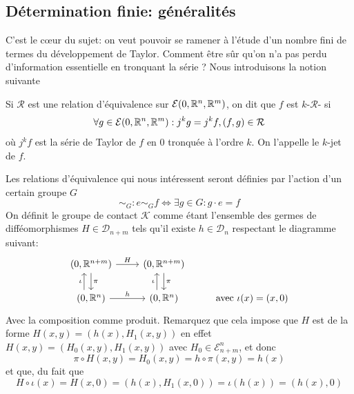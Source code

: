 \documentclass[memoire.tex]{subfiles}
\begin{document}
\subsection{Détermination finie: généralités}\label{detfin}
C'est le cœur du sujet: on veut 
pouvoir se ramener à l'étude d'un nombre fini de termes du développement de Taylor. Comment être sûr qu'on n'a pas perdu d'information essentielle en tronquant la série ?
Nous introduisons la notion suivante
\begin{definition}
    Si $\mathcal{R}$ est une relation 
    d'équivalence sur $\mathcal{E}(0,\mathbb{R}^n,\mathbb{R}^m)$, on dit que $f$ est $k$-$\mathcal{R}$- si 
    \begin{equation*}
        \forall g\in \mathcal{E}(0,\mathbb{R}^n,\mathbb{R}^m): j^k g=j^k f, (f,g)\in\mathcal{R}
    \end{equation*}
    où $j^k f$ est la série de Taylor de $f$ en $0$ tronquée à l'ordre $k$. On l'appelle le $k$-jet de $f$.
\end{definition}
Les relations d'équivalence qui nous intéressent seront définies par l'action d'un certain groupe $G$
 \begin{equation*}
    \sim_G : e \sim_Gf \Leftrightarrow \exists g\in G : g\cdot e=f
 \end{equation*}
 On définit le groupe de contact $\mathcal{K}$ comme étant l'ensemble des germes de difféomorphismes $H\in\mathcal{D}_{n+m}$ tels qu'il existe $h\in\mathcal{D}_n$ respectant le  diagramme suivant:
\[\begin{tikzcd}
	{(0,\R^{n+m})} & {(0,\R^{n+m})} & \\
	{(0,\R^n)} & {(0,\R^n)} & {\text{avec }\iota(x)=(x,0)}
	\arrow["H", from=1-1, to=1-2]
	\arrow["\pi", from=1-1, to=2-1]
	\arrow["\pi", from=1-2, to=2-2]
	\arrow["\iota", shift left=3, from=2-1, to=1-1]
	\arrow["h", from=2-1, to=2-2]
	\arrow["\iota", shift left=3, from=2-2, to=1-2]
\end{tikzcd}\]
Avec la composition comme produit.
Remarquez que cela impose que $H$ est de la forme $H(x,y)=(h(x),H_1(x,y))$ en effet 
$H(x,y)=(H_0(x,y),H_1(x,y))$ avec $H_0\in\mathcal{E}^n_{n+m}$, et donc 
\begin{equation*}\label{Structpi}
    \pi\circ H(x,y)= H_0(x,y)=h\circ\pi(x,y)=h(x)
\end{equation*} et que, du fait que 
\begin{equation*}
    H\circ \iota(x)=H(x,0)=(h(x),H_1(x,0))=\iota(h(x))=(h(x),0)
\end{equation*}
\end{document}
